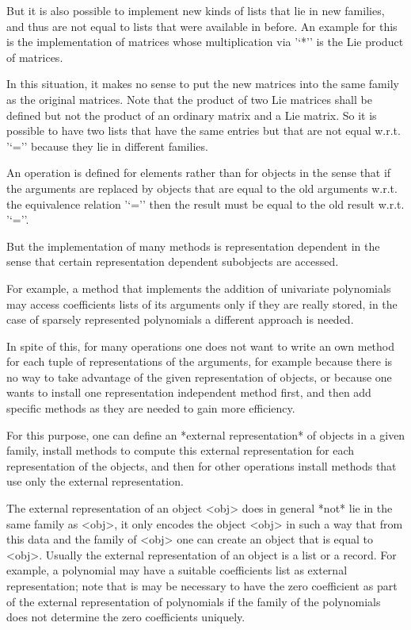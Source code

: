 But it is also possible to implement new kinds of lists that lie in
new families, and thus are not equal to lists that were available
in {\GAP} before.
An example for this is the implementation of matrices
whose multiplication via '`*'' is the Lie product of matrices.

In this situation, it makes no sense to put the new matrices into the
same family as the original matrices.
Note that the product of two Lie matrices shall be defined but not the
product of an ordinary matrix and a Lie matrix.
So it is possible to have two lists that have the same entries but that
are not equal w.r.t. '`='' because they lie in different families.



An operation is defined for elements rather than for objects in the sense
that if the arguments are replaced by objects that are equal to the old
arguments w.r.t. the equivalence relation '`='' then the result must be
equal to the old result w.r.t. '`=''.

But the implementation of many methods is representation dependent in the
sense that certain representation dependent subobjects are accessed.

For example, a method that implements the addition of univariate
polynomials may access coefficients lists of its arguments
only if they are really stored, 
in the case of sparsely represented polynomials a different approach is
needed.

In spite of this, for many operations one does not want to write an own
method for each tuple of representations of the arguments,
for example because there is no way to take advantage of the given
representation of objects,
or because one wants to install one representation independent method
first, and then add specific methods as they are needed to gain more
efficiency.

For this purpose,
one can define an *external representation* of objects in a given family,
install methods to compute this external representation for each
representation of the objects,
and then for other operations install methods that use only the external
representation.

The external representation of an object <obj> does in general *not* lie
in the same family as <obj>,
it only encodes the object <obj> in such a way that from this data and
the family of <obj> one can create an object that is equal to <obj>.
Usually the external representation of an object is a list or a record.
For example, a polynomial may have a suitable coefficients list as
external representation;
note that is may be necessary to have the zero coefficient as part of
the external representation of polynomials if the family of the
polynomials does not determine the zero coefficients uniquely.

